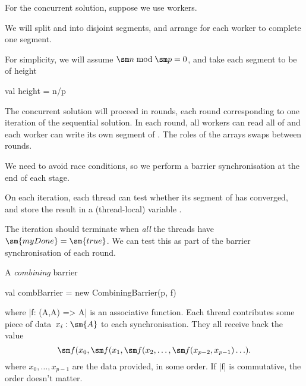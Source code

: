
\begin{slide}

For the concurrent solution, suppose we use  workers.

We will split  and  into  disjoint
segments, and arrange for each worker to complete one segment.

For simplicity, we will assume $\sm n \bmod \sm p = 0$, and take each
segment to be of height
\begin{scala}
val height = n/p
\end{scala}
\end{slide}


\begin{slide}

The concurrent solution will proceed in rounds, each round corresponding to
one iteration of the sequential solution.  In each round, all workers can read
all of  and each worker can write its own segment of .
The roles of the arrays swaps between rounds.

We need to avoid race conditions, so we perform a barrier synchronisation at
the end of each stage.

\end{slide}


\begin{slide}

On each iteration, each thread can test whether its segment of  has
converged, and store the result in a (thread-local) variable .

The iteration should terminate when \emph{all} the threads have $\sm{myDone} =
\sm{true}$.  We can test this as part of the barrier synchronisation of each
round.

A \emph{combining} barrier 
\begin{scala}
  val combBarrier = new CombiningBarrier(p, f)
\end{scala}
%
where |f: (A,A) => A| is an associative function.  Each thread contributes
some piece of data~$x_i: \sm{A}$ to each synchronisation.  They all receive
back  the value
\[
\sm f(x_0, \sm f(x_1, \sm f(x_2, \ldots, \sm f(x_{p-2}, x_{p-1})\ldots).
\]
where $x_0, \ldots, x_{p-1}$ are the data provided, in some order.  If |f| is
commutative, the order doesn't matter. 
\end{slide}

